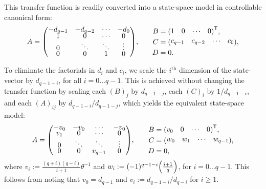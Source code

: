 \documentclass[12pt]{article}
\theoremstyle{definition}
\newcommand{\transpose}[1]{{#1}^\mathsf{T}}
\let\originalleft\left
\let\originalright\right
\renewcommand{\left}{\mathopen{}\mathclose\bgroup\originalleft}
\renewcommand{\right}{\aftergroup\egroup\originalright}
\newenvironment{hpmatrix}{\begingroup\def\arraystretch{0.5}\begin{pmatrix}}{\end{pmatrix}\endgroup\ignorespacesafterend}
\begin{document}
This transfer function is readily converted into a state-space model in controllable canonical form:
\begin{equation*}
    \begin{alignedat}{2}
        A &= \begin{hpmatrix} -d_{q-1} & -d_{q-2} & \cdots & -d_0 \\ 1 & 0 & \cdots & 0 \\ 0 & \ddots & \ddots & \vdots \\ 0 & 0 & 1 & 0\end{hpmatrix} \text{,} & & \quad\quad \begin{alignedat}{1}
            B &= \transpose{\begin{hpmatrix} 1 & 0 & \cdots & 0\end{hpmatrix}} \text{,} \\
            C &= \begin{hpmatrix} c_{q-1} & c_{q-2} & \cdots & c_0\end{hpmatrix} \text{,} \\
            D &= 0 \text{.}
        \end{alignedat}
    \end{alignedat}
\end{equation*}

To eliminate the factorials in $d_i$ and $c_i$, we scale the $i^{\text{th}}$ dimension of the state-vector by $d_{q-1-i}$, for all $i = 0 \ldots q - 1$.
This is achieved without changing the transfer function by scaling each $(B)_j$ by $d_{q-1-j}$, each $(C)_i$ by $1 / d_{q-1-i}$, and each $(A)_{ij}$ by $d_{q-1-i} / d_{q-1-j}$, which yields the equivalent state-space model:
\begin{equation*}
    \begin{alignedat}{2}
        A &= \begin{hpmatrix} -v_0 & -v_0 & \cdots & -v_0 \\ v_1 & 0 & \cdots & 0 \\ 0 & \ddots & \ddots & \vdots \\ 0 & 0 & v_{q-1} & 0\end{hpmatrix} \text{,} & & \quad\quad \begin{alignedat}{1}
            B &= \transpose{\begin{hpmatrix} v_0 & 0 & \cdots & 0\end{hpmatrix}} \text{,} \\
            C &= \begin{hpmatrix} w_0 & w_1 & \cdots & w_{q-1} \end{hpmatrix} \text{,} \\
            D &= 0 \text{,}
        \end{alignedat}
    \end{alignedat}
\end{equation*}
where $v_i := \frac{(q+i)(q-i)}{i+1} \theta^{-1}$ and $w_i := (-1)^{q - 1 - i} \left( \frac{i+1}{q} \right)$, for $i = 0 \ldots q-1$.
This follows from noting that $v_0 = d_{q-1}$ and $v_i := d_{q-1-i} / d_{q-i}$ for $i \ge 1$.
\end{document}
